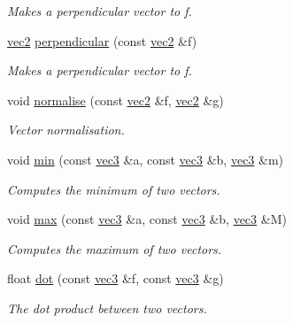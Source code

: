\begin{DoxyCompactItemize}
\begin{DoxyCompactList}\small\item\em Makes a perpendicular vector to {\itshape f}. \end{DoxyCompactList}\item 
\hyperlink{structphysim_1_1math_1_1vec2}{vec2} \hyperlink{namespacephysim_1_1math_a5fa60d9192d57b248fd5aef6cae2ec5b}{perpendicular} (const \hyperlink{structphysim_1_1math_1_1vec2}{vec2} \&f)
\begin{DoxyCompactList}\small\item\em Makes a perpendicular vector to {\itshape f}. \end{DoxyCompactList}\item 
void \hyperlink{namespacephysim_1_1math_af5428f77daf8d0b8d6c91343f98c3f32}{normalise} (const \hyperlink{structphysim_1_1math_1_1vec2}{vec2} \&f, \hyperlink{structphysim_1_1math_1_1vec2}{vec2} \&g)
\begin{DoxyCompactList}\small\item\em Vector normalisation. \end{DoxyCompactList}\item 
void \hyperlink{namespacephysim_1_1math_af828881d225d22df1a7049d5eccb0323}{min} (const \hyperlink{structphysim_1_1math_1_1vec3}{vec3} \&a, const \hyperlink{structphysim_1_1math_1_1vec3}{vec3} \&b, \hyperlink{structphysim_1_1math_1_1vec3}{vec3} \&m)
\begin{DoxyCompactList}\small\item\em Computes the minimum of two vectors. \end{DoxyCompactList}\item 
void \hyperlink{namespacephysim_1_1math_a0c47a45a0b76bb0d4d1d0684ffe40ff0}{max} (const \hyperlink{structphysim_1_1math_1_1vec3}{vec3} \&a, const \hyperlink{structphysim_1_1math_1_1vec3}{vec3} \&b, \hyperlink{structphysim_1_1math_1_1vec3}{vec3} \&M)
\begin{DoxyCompactList}\small\item\em Computes the maximum of two vectors. \end{DoxyCompactList}\item 
\mbox{\label{namespacephysim_1_1math_ace02057bfed8d85dce266dea1d7edf6d}} 
float \hyperlink{namespacephysim_1_1math_ace02057bfed8d85dce266dea1d7edf6d}{dot} (const \hyperlink{structphysim_1_1math_1_1vec3}{vec3} \&f, const \hyperlink{structphysim_1_1math_1_1vec3}{vec3} \&g)
\begin{DoxyCompactList}\small\item\em The dot product between two vectors. \end{DoxyCompactList}\item 

\end{DoxyCompactItemize}
